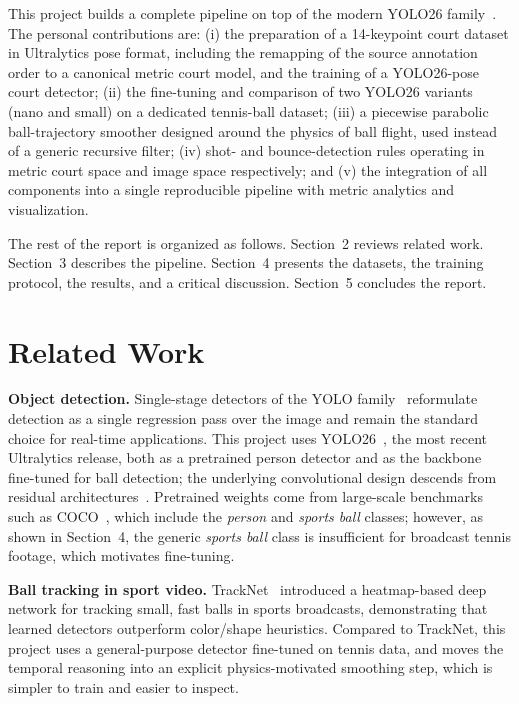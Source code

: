 \documentclass[10pt,twocolumn,a4paper]{article}
\begin{document}
	This project builds a complete pipeline on top of the modern YOLO26 family~\cite{ultralytics_yolo}. The personal contributions are: (i) the preparation of a 14-keypoint court dataset in Ultralytics pose format, including the remapping of the source annotation order to a canonical metric court model, and the training of a YOLO26-pose court detector; (ii) the fine-tuning and comparison of two YOLO26 variants (nano and small) on a dedicated tennis-ball dataset; (iii) a piecewise parabolic ball-trajectory smoother designed around the physics of ball flight, used instead of a generic recursive filter; (iv) shot- and bounce-detection rules operating in metric court space and image space respectively; and (v) the integration of all components into a single reproducible pipeline with metric analytics and visualization.

	The rest of the report is organized as follows. Section~2 reviews related work. Section~3 describes the pipeline. Section~4 presents the datasets, the training protocol, the results, and a critical discussion. Section~5 concludes the report.

	\section{Related Work}

	\textbf{Object detection.} Single-stage detectors of the YOLO family~\cite{redmon2016yolo} reformulate detection as a single regression pass over the image and remain the standard choice for real-time applications. This project uses YOLO26~\cite{ultralytics_yolo}, the most recent Ultralytics release, both as a pretrained person detector and as the backbone fine-tuned for ball detection; the underlying convolutional design descends from residual architectures~\cite{he2016resnet}. Pretrained weights come from large-scale benchmarks such as COCO~\cite{lin2014coco}, which include the \emph{person} and \emph{sports ball} classes; however, as shown in Section~4, the generic \emph{sports ball} class is insufficient for broadcast tennis footage, which motivates fine-tuning.

	\textbf{Ball tracking in sport video.} TrackNet~\cite{huang2019tracknet} introduced a heatmap-based deep network for tracking small, fast balls in sports broadcasts, demonstrating that learned detectors outperform color/shape heuristics. Compared to TrackNet, this project uses a general-purpose detector fine-tuned on tennis data, and moves the temporal reasoning into an explicit physics-motivated smoothing step, which is simpler to train and easier to inspect.
\end{document}
